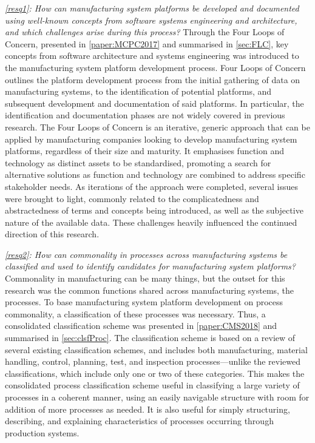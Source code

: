 \emph{\cref{resq1}: How can manufacturing system platforms be developed and documented using well-known concepts from software systems engineering and architecture, and which challenges arise during this process?} 
Through the Four Loops of Concern, presented in \cref{paper:MCPC2017} and summarised in \cref{sec:FLC}, key concepts from software architecture and systems engineering was introduced to the manufacturing system platform development process.
Four Loops of Concern outlines the platform development process from the initial gathering of data on manufacturing systems, to the identification of potential platforms, and subsequent development and documentation of said platforms.
In particular, the identification and documentation phases are not widely covered in previous research.
The Four Loops of Concern is an iterative, generic approach that can be applied by manufacturing companies looking to develop manufacturing system platforms, regardless of their size and maturity.
It emphasises function and technology as distinct assets to be standardised, promoting a search for alternative solutions as function and technology are combined to address specific stakeholder needs.
As iterations of the approach were completed, several issues were brought to light, commonly related to the complicatedness and abstractedness of terms and concepts being introduced, as well as the subjective nature of the available data.
These challenges heavily influenced the continued direction of this research.

\emph{\cref{resq2}: How can commonality in processes across manufacturing systems be classified and used to identify candidates for manufacturing system platforms?}
Commonality in manufacturing can be many things, but the outset for this research was the common functions shared across manufacturing systems, \ie{} the processes. 
To base manufacturing system platform development on process commonality, a classification of these processes was necessary.
Thus, a consolidated classification scheme was presented in \cref{paper:CMS2018} and summarised in \cref{sec:clsfProc}.
The classification scheme is based on a review of several existing classification schemes, and includes both manufacturing, material handling, control, planning, test, and inspection processes---unlike the reviewed classifications, which include only one or two of these categories.
This makes the consolidated process classification scheme useful in classifying a large variety of processes in a coherent manner, using an easily navigable structure with room for addition of more processes as needed.
It is also useful for simply structuring, describing, and explaining characteristics of processes occurring through production systems.

